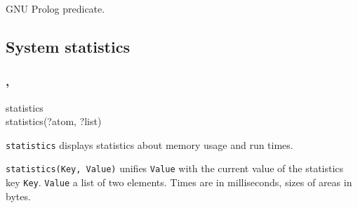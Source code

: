 \Portability

GNU Prolog predicate.

\subsection{System statistics}

\subsubsection{,\label{statistics/2}
               }

\begin{TemplatesOneCol}
statistics\\
statistics(?atom, ?list)

\end{TemplatesOneCol}

\Description

\texttt{statistics} displays statistics about memory usage and run times.

\texttt{statistics(Key, Value)} unifies \texttt{Value} with the current
value of the statistics key \texttt{Key}. \texttt{Value} a list of two
elements. Times are in milliseconds, sizes of areas in bytes.

